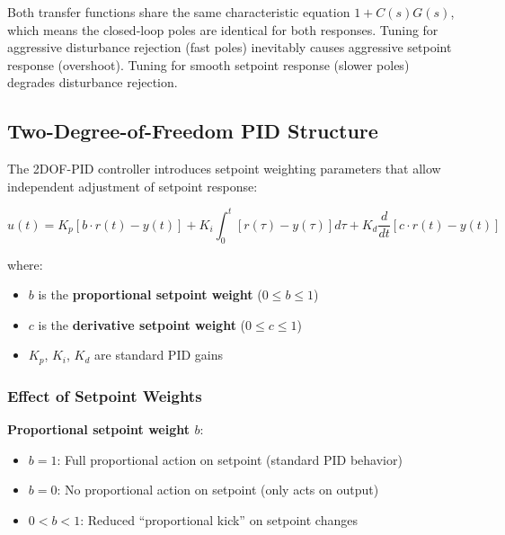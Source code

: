 Both transfer functions share the same characteristic equation $1 + C(s)G(s)$, which means the closed-loop poles are identical for both responses. Tuning for aggressive disturbance rejection (fast poles) inevitably causes aggressive setpoint response (overshoot). Tuning for smooth setpoint response (slower poles) degrades disturbance rejection.


\subsection{Two-Degree-of-Freedom PID Structure}
\label{subsec:2dof_pid}

The 2DOF-PID controller introduces setpoint weighting parameters that allow independent adjustment of setpoint response:

\begin{equation}
\boxed{u(t) = K_p[b \cdot r(t) - y(t)] + K_i \int_0^t [r(\tau) - y(\tau)] d\tau + K_d \frac{d}{dt}[c \cdot r(t) - y(t)]}
\label{eq:2dof_pid}
\end{equation}

where:
\begin{itemize}
    \item $b$ is the \textbf{proportional setpoint weight} ($0 \leq b \leq 1$)
    \item $c$ is the \textbf{derivative setpoint weight} ($0 \leq c \leq 1$)
    \item $K_p$, $K_i$, $K_d$ are standard PID gains
\end{itemize}

\subsubsection{Effect of Setpoint Weights}

\textbf{Proportional setpoint weight $b$}:
\begin{itemize}
    \item $b = 1$: Full proportional action on setpoint (standard PID behavior)
    \item $b = 0$: No proportional action on setpoint (only acts on output)
    \item $0 < b < 1$: Reduced ``proportional kick'' on setpoint changes
\end{itemize}

